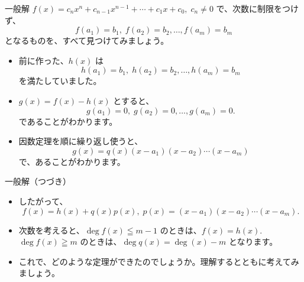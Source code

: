 \documentclass[10pt, dvipdfmx]{beamer}
\begin{document}
\begin{frame}{一般解}
\(f(x) = c_nx^n + c_{n-1}x^{n-1} + \cdots + c_1x+c_0, \; c_n \neq 0\) で、次数に制限をつけず、  
\[ f(a_1) = b_1, \; f(a_2) = b_2, \ldots, f(a_m) = b_m \] 
となるものを、すべて見つけてみましょう。\par
\begin{itemize}
\item 前に作った、\(h(x)\) は
\[ h(a_1) = b_1, \; h(a_2) = b_2, \ldots, h(a_m) = b_m \] 
を満たしていました。
\item \(g(x) = f(x)-h(x)\) とすると、 
\[ g(a_1) = 0, \; g(a_2) = 0, \ldots, g(a_m) = 0. \] 
であることがわかります。
\item 因数定理を順に繰り返し使うと、
\[ g(x) = q(x)(x-a_1)(x-a_2)\cdots (x-a_m) \] 
で、あることがわかります。
\end{itemize}
\end{frame}
\begin{frame}{一般解（つづき）}
\begin{itemize}
\item したがって、 
\[ f(x) = h(x) + q(x)p(x), \; p(x) = (x-a_1)(x-a_2)\cdots (x-a_m). \]
\item 次数を考えると、\(\deg f(x) \leqq m-1\) のときは、\(f(x) = h(x)\). \(\deg f(x) \geqq m\) のときは、\(\deg q(x) = \deg(x)-m\) となります。
\item これで、どのような定理ができたのでしょうか。理解するとともに考えてみましょう。
\end{itemize}
\end{frame}
\end{document}
